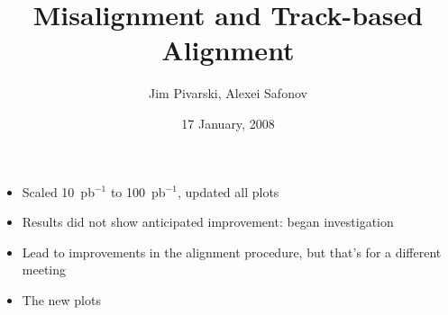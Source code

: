 \documentclass[compress]{beamer}
\title{Misalignment and Track-based Alignment}
\author{Jim Pivarski, Alexei Safonov}
\institute{Texas A\&M University}
\date{17 January, 2008}
\begin{document}
\frame{\titlepage}


\begin{frame}
\begin{itemize}\setlength{\itemsep}{0.75 cm}
\item Scaled 10~pb$^{-1}$ to 100~pb$^{-1}$, updated all plots
\item Results did not show anticipated improvement: began investigation
\item Lead to improvements in the alignment procedure, but that's for a different meeting
\item The new plots
\end{itemize}
\end{frame}
\end{document}
